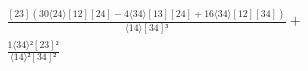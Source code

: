 \documentclass[varwidth, border=5pt]{standalone}
\begin{document}
\begin{my}
$\begin{gathered}
\scriptscriptstyle\frac{[23](30⟨24⟩[12][24]-4⟨34⟩[13][24]+16⟨34⟩[12][34])}{⟨14⟩[34]³} +\\
\scriptscriptstyle\frac{1⟨34⟩²[23]²}{⟨14⟩²[34]²} \phantom{+}
\end{gathered}$
\end{my}
\end{document}
